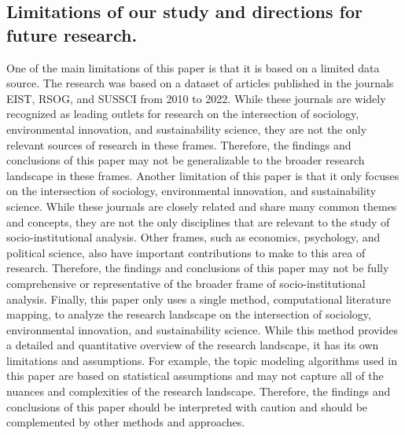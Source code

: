 \documentclass[12pt]{article}
\begin{document}
\subsection{Limitations of our study and directions for future research.}
\label{sec:limitations}
One of the main limitations of this paper is that it is based on a limited data source. The research was based on a dataset of articles published in the journals EIST, RSOG, and SUSSCI from 2010 to 2022. While these journals are widely recognized as leading outlets for research on the intersection of sociology, environmental innovation, and sustainability science, they are not the only relevant sources of research in these frames. Therefore, the findings and conclusions of this paper may not be generalizable to the broader research landscape in these frames. Another limitation of this paper is that it only focuses on the intersection of sociology, environmental innovation, and sustainability science. While these journals are closely related and share many common themes and concepts, they are not the only disciplines that are relevant to the study of socio-institutional analysis. Other frames, such as economics, psychology, and political science, also have important contributions to make to this area of research. Therefore, the findings and conclusions of this paper may not be fully comprehensive or representative of the broader frame of socio-institutional analysis.
Finally, this paper only uses a single method, computational literature mapping, to analyze the research landscape on the intersection of sociology, environmental innovation, and sustainability science. While this method provides a detailed and quantitative overview of the research landscape, it has its own limitations and assumptions. For example, the topic modeling algorithms used in this paper are based on statistical assumptions and may not capture all of the nuances and complexities of the research landscape. Therefore, the findings and conclusions of this paper should be interpreted with caution and should be complemented by other methods and approaches.
\end{document}
